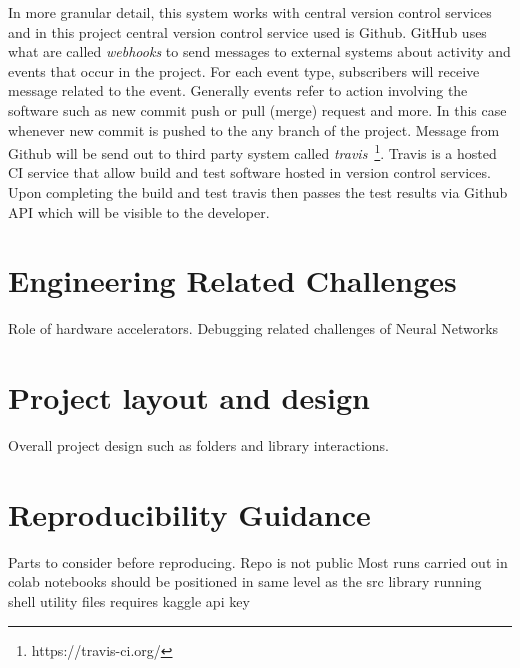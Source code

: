In more granular detail, this system works with central version control services and in this project central version control service used is Github. GitHub uses what are called \emph{webhooks} to send messages to external systems about activity and events that occur in the project. For each event type, subscribers will receive message related to the event. Generally events refer to action involving the software such as new commit push or pull (merge) request and more. In this case whenever new commit is pushed to the any branch of the project. Message from Github will be send out to third party system called \emph{travis}~\footnote{https://travis-ci.org/}. Travis is a hosted CI service that allow build and test software hosted in version control services. Upon completing the build and test travis then passes the test results via Github API which will be visible to the developer. 

\section{Engineering Related Challenges}
Role of hardware accelerators. Debugging related challenges of Neural Networks

\section{Project layout and design}
Overall project design such as folders and library interactions.

\section{Reproducibility Guidance}
Parts to consider before reproducing.
Repo is not public
Most runs carried out in colab 
notebooks should be positioned in same level as the src library
running shell utility files requires kaggle api key


\clearpage